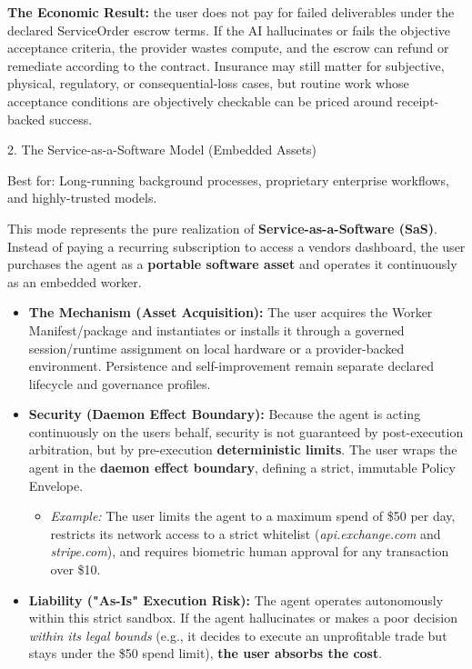 \documentclass[
  11pt,
]{article}
\providecommand{\tightlist}{%
  \setlength{\itemsep}{0pt}\setlength{\parskip}{0pt}}
\begin{document}
\textbf{The Economic Result:} the user does not pay for failed
deliverables under the declared ServiceOrder escrow terms. If the AI
hallucinates or fails the objective acceptance criteria, the provider
wastes compute, and the escrow can refund or remediate according to the
contract. Insurance may still matter for subjective, physical,
regulatory, or consequential-loss cases, but routine work whose
acceptance conditions are objectively checkable can be priced around
receipt-backed success.

2. The Service-as-a-Software Model (Embedded Assets)

Best for: Long-running background processes, proprietary enterprise
workflows, and highly-trusted models.

This mode represents the pure realization of
\textbf{Service-as-a-Software (SaS)}. Instead of paying a recurring
subscription to access a vendor\textquotesingle s dashboard, the user
purchases the agent as a \textbf{portable software asset} and operates
it continuously as an embedded worker.

\begin{itemize}
\item
  \textbf{The Mechanism (Asset Acquisition):} The user acquires the
  Worker Manifest/package and instantiates or installs it through a governed
  session/runtime assignment on local hardware or a provider-backed
  environment. Persistence and self-improvement remain separate declared
  lifecycle and governance profiles.
\item
  \textbf{Security (Daemon Effect Boundary):} Because the agent is acting
  continuously on the user\textquotesingle s behalf, security is not
  guaranteed by post-execution arbitration, but by pre-execution
  \textbf{deterministic limits}. The user wraps the agent in the
  \textbf{daemon effect boundary}, defining a strict, immutable Policy
  Envelope.

  \begin{itemize}
  \tightlist
  \item
    \emph{Example:} The user limits the agent to a maximum spend of \$50
    per day, restricts its network access to a strict whitelist
    (\emph{api.exchange.com} and \emph{stripe.com}), and requires
    biometric human approval for any transaction over \$10.
  \end{itemize}
\item
  \textbf{Liability ("As-Is" Execution Risk):} The agent operates
  autonomously within this strict sandbox. If the agent hallucinates or
  makes a poor decision \emph{within its legal bounds} (e.g., it decides
  to execute an unprofitable trade but stays under the \$50 spend
  limit), \textbf{the user absorbs the cost}.
\end{itemize}
\end{document}
